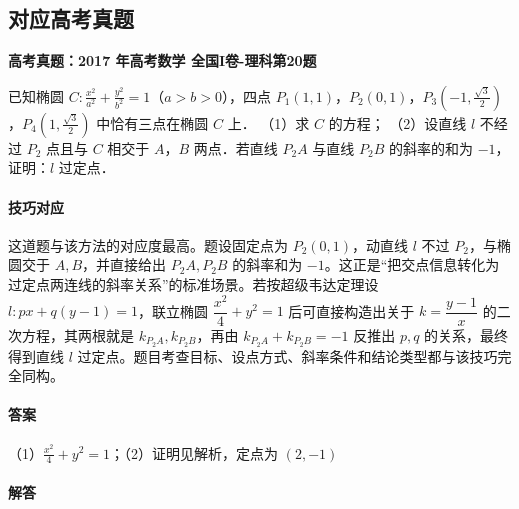 \documentclass[UTF8,a4paper,11pt]{ctexart}
\newenvironment{gaokao}[1]{\par\medskip\noindent\textbf{高考真题：#1}\par\smallskip}{\par\medskip}
\begin{document}
\subsection*{对应高考真题}

\begin{gaokao}{2017 年高考数学 全国I卷-理科第20题}

已知椭圆 $C:\frac{x^2}{a^2}+\frac{y^2}{b^2}=1$（$a>b>0$），四点 $P_1(1,1)$，$P_2(0,1)$，$P_3(-1,\frac{\sqrt{3}}{2})$，$P_4(1,\frac{\sqrt{3}}{2})$ 中恰有三点在椭圆 $C$ 上．
（1）求 $C$ 的方程；
（2）设直线 $l$ 不经过 $P_2$ 点且与 $C$ 相交于 $A$，$B$ 两点．若直线 $P_2A$ 与直线 $P_2B$ 的斜率的和为 $-1$，证明：$l$ 过定点．

\paragraph{技巧对应}

这道题与该方法的对应度最高。题设固定点为 $P_2(0,1)$，动直线 $l$ 不过 $P_2$，与椭圆交于 $A,B$，并直接给出 $P_2A,P_2B$ 的斜率和为 $-1$。这正是“把交点信息转化为过定点两连线的斜率关系”的标准场景。若按超级韦达定理设 $l:px+q(y-1)=1$，联立椭圆 $\dfrac{x^2}{4}+y^2=1$ 后可直接构造出关于 $k=\dfrac{y-1}{x}$ 的二次方程，其两根就是 $k_{P_2A},k_{P_2B}$，再由 $k_{P_2A}+k_{P_2B}=-1$ 反推出 $p,q$ 的关系，最终得到直线 $l$ 过定点。题目考查目标、设点方式、斜率条件和结论类型都与该技巧完全同构。

\paragraph{答案}

（1）$\frac{x^2}{4}+y^2=1$；（2）证明见解析，定点为 $(2,-1)$

\paragraph{解答}


\end{gaokao}
\end{document}
